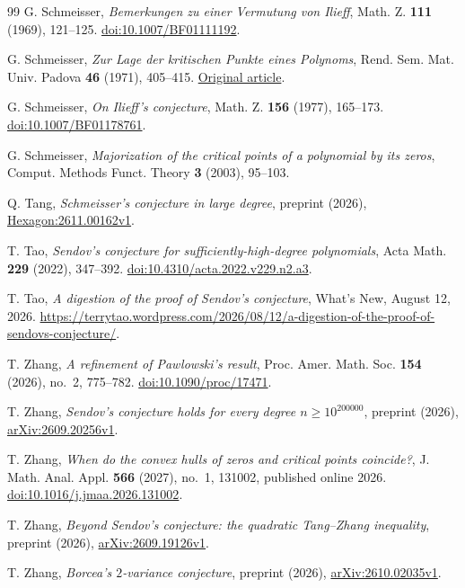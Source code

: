 \documentclass[11pt,reqno]{amsart}
\numberwithin{equation}{section}
\theoremstyle{definition}
\theoremstyle{remark}
\begin{document}
\begin{thebibliography}{99}
G. Schmeisser, \emph{Bemerkungen zu einer Vermutung von Ilieff},
Math. Z. \textbf{111} (1969), 121--125.
\href{https://doi.org/10.1007/BF01111192}{doi:10.1007/BF01111192}.

G. Schmeisser, \emph{Zur Lage der kritischen Punkte eines Polynoms},
Rend. Sem. Mat. Univ. Padova \textbf{46} (1971), 405--415.
\href{https://www.numdam.org/item/RSMUP_1971__46__405_0/}{Original article}.

G. Schmeisser, \emph{On Ilieff's conjecture},
Math. Z. \textbf{156} (1977), 165--173.
\href{https://doi.org/10.1007/BF01178761}{doi:10.1007/BF01178761}.

G. Schmeisser, \emph{Majorization of the critical points of a polynomial
by its zeros}, Comput. Methods Funct. Theory \textbf{3} (2003), 95--103.

Q. Tang, \emph{Schmeisser's conjecture in large degree}, preprint
(2026), \href{https://hexagonmath.org/2611.00162v1}{Hexagon:2611.00162v1}.

T. Tao, \emph{Sendov's conjecture for sufficiently-high-degree
polynomials}, Acta Math. \textbf{229} (2022), 347--392.
\href{https://doi.org/10.4310/acta.2022.v229.n2.a3}{doi:10.4310/acta.2022.v229.n2.a3}.

T. Tao, \emph{A digestion of the proof of Sendov's conjecture},
What's New, August 12, 2026.
\url{https://terrytao.wordpress.com/2026/08/12/a-digestion-of-the-proof-of-sendovs-conjecture/}.

T. Zhang, \emph{A refinement of Pawlowski's result}, Proc. Amer. Math.
Soc. \textbf{154} (2026), no.~2, 775--782.
\href{https://doi.org/10.1090/proc/17471}{doi:10.1090/proc/17471}.

T. Zhang, \emph{Sendov's conjecture holds for every degree
$n\ge10^{200000}$}, preprint (2026),
\href{https://arxiv.org/abs/2609.20256v1}{arXiv:2609.20256v1}.

T. Zhang, \emph{When do the convex hulls of zeros and critical points
coincide?}, J. Math. Anal. Appl. \textbf{566} (2027), no.~1, 131002,
published online 2026.
\href{https://doi.org/10.1016/j.jmaa.2026.131002}{doi:10.1016/j.jmaa.2026.131002}.

T. Zhang, \emph{Beyond Sendov's conjecture: the quadratic Tang--Zhang
inequality}, preprint (2026),
\href{https://arxiv.org/abs/2609.19126v1}{arXiv:2609.19126v1}.

T. Zhang, \emph{Borcea's $2$-variance conjecture}, preprint (2026),
\href{https://arxiv.org/abs/2610.02035v1}{arXiv:2610.02035v1}.

\end{thebibliography}
\end{document}
